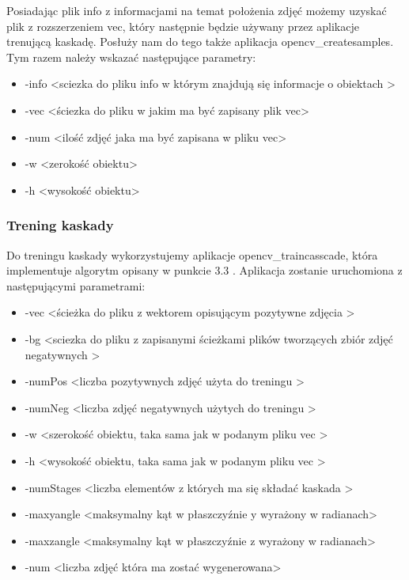 Posiadając plik info z informacjami na temat położenia zdjęć możemy uzyskać plik z rozszerzeniem vec, który następnie będzie używany przez aplikacje trenującą kaskadę. Posłuży nam do tego także aplikacja opencv\_createsamples. Tym razem należy wskazać następujące parametry:

\begin{itemize}
    \item -info \textless sciezka do pliku info w którym znajdują się informacje o obiektach \textgreater
    \item -vec \textless ściezka do pliku w jakim ma być zapisany plik vec\textgreater
    \item -num \textless ilość zdjęć jaka ma być zapisana w pliku vec\textgreater
    \item -w \textless zerokość obiektu\textgreater
    \item -h \textless wysokość obiektu\textgreater

\end{itemize}

\subsubsection{Trening kaskady}

Do treningu kaskady wykorzystujemy aplikacje opencv\_traincasscade, która implementuje algorytm opisany w punkcie 3.3 . Aplikacja zostanie uruchomiona z następującymi parametrami:

\begin{itemize}
    \item -vec \textless ścieżka do pliku z wektorem opisującym pozytywne zdjęcia \textgreater
    \item -bg \textless sciezka do pliku z zapisanymi ścieżkami plików tworzących zbiór zdjęć negatywnych \textgreater
    \item -numPos \textless liczba pozytywnych zdjęć użyta do treningu \textgreater
    \item -numNeg \textless liczba zdjęć negatywnych użytych do treningu \textgreater
    \item -w \textless szerokość obiektu, taka sama jak w podanym pliku vec \textgreater
    \item -h \textless wysokość obiektu, taka sama jak w podanym pliku vec \textgreater
    \item -numStages \textless liczba elementów z których ma się składać kaskada \textgreater
    \item -maxyangle \textless maksymalny kąt w płaszczyźnie y wyrażony w radianach\textgreater
    \item -maxzangle \textless maksymalny kąt w płaszczyźnie z wyrażony w radianach\textgreater
    \item -num \textless liczba zdjęć która ma zostać wygenerowana>

\end{itemize}

